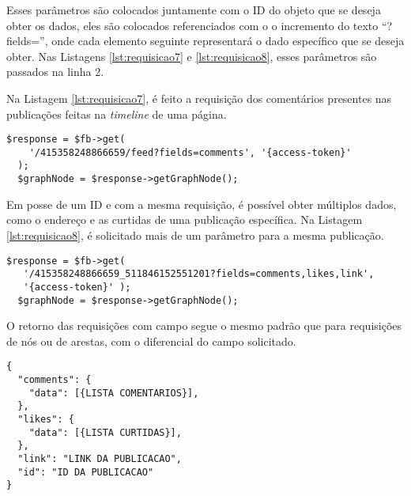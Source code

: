 Esses parâmetros são colocados juntamente com o ID do objeto que se deseja obter os dados, eles são colocados referenciados com o o incremento do texto ``?fields='', onde cada elemento seguinte representará o dado específico que se deseja obter. Nas Listagens \ref{lst:requisicao7} e \ref{lst:requisicao8}, esses parâmetros são passados na linha 2.

Na Listagem \ref{lst:requisicao7}, é feito a requisição dos comentários presentes nas publicações feitas na \textit{timeline} de uma página.

\begin{lstlisting}[caption={Requisitar os comentários de todas as publicações da página},label={lst:requisicao7}]
  $response = $fb->get(
    '/415358248866659/feed?fields=comments', '{access-token}' 
  );
  $graphNode = $response->getGraphNode(); 
\end{lstlisting}

Em posse de um ID e com a mesma requisição, é possível obter múltiplos dados, como o endereço e as curtidas de uma publicação específica. Na Listagem \ref{lst:requisicao8}, é solicitado mais de um parâmetro para a mesma publicação.

\begin{lstlisting}[caption={Requisição de múltiplos campos},label={lst:requisicao8}]
  $response = $fb->get(
   '/415358248866659_511846152551201?fields=comments,likes,link', 
   '{access-token}' );
  $graphNode = $response->getGraphNode();
\end{lstlisting}

O retorno das requisições com campo segue o mesmo padrão que para requisições de nós ou de arestas, com o diferencial do campo solicitado.

\begin{lstlisting}[caption={Retorno da requisição \ref{lst:requisicao8}}, label={lst:retornoRequisicao8}]
{
  "comments": {
    "data": [{LISTA COMENTARIOS}],
  },
  "likes": {
    "data": [{LISTA CURTIDAS}],
  },
  "link": "LINK DA PUBLICACAO",
  "id": "ID DA PUBLICACAO"
}
\end{lstlisting}